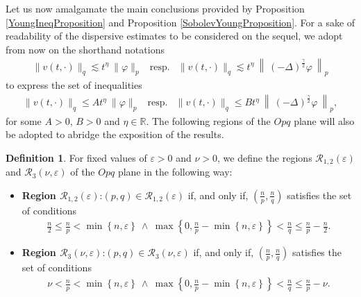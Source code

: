 \documentclass{amsart}
\theoremstyle{definition}
\newtheorem{definition}[theorem]{Definition}
\theoremstyle{remark}
\numberwithin{equation}{section}
\begin{document}
Let us now amalgamate the main conclusions provided by Proposition \ref{YoungIneqProposition} and Proposition \ref{SobolevYoungProposition}.
For a sake of readability of the dispersive estimates to be considered on the sequel, we adopt from now on the shorthand notations 
\begin{eqnarray*}
	\|v(t,\cdot)\|_q\lesssim t^{\eta}~\|\varphi\|_p & \mbox{resp.}& \|v(t,\cdot)\|_q\lesssim t^{\eta}~\left\|~(-\Delta)^{\frac{\gamma}{2}}\varphi~\right\|_p 
\end{eqnarray*} 
to express the set of inequalities
\begin{eqnarray*}
	\|v(t,\cdot)\|_q\leq At^{\eta}~\|\varphi\|_p & \mbox{resp.} & \|v(t,\cdot)\|_q\leq B t^{\eta}~\left\|~(-\Delta)^{\frac{\gamma}{2}}\varphi~\right\|_p, 
\end{eqnarray*}
for some $A>0$, $B>0$ and $\eta \in \mathbb{R}$. The following regions of the
$Opq$ plane will also be adopted to abridge the exposition of the results.\newpage 
\begin{definition}
	For fixed values of $\varepsilon>0$ and $\nu>0$, we define the regions $\mathcal{R}_{1,2}(\varepsilon)$ and $\mathcal{R}_{3}(\nu,\varepsilon)$ of the $Opq$ plane in the following way:
	\begin{itemize}
		\item[~]{\bf Region $\mathcal{R}_{1,2}(\varepsilon)$}:\newline $(p,q)\in \mathcal{R}_{1,2}(\varepsilon)$ if, and only if, $\displaystyle \left(\frac{n}{p},\frac{n}{q}\right)$ satisfies the set of conditions
		\begin{eqnarray}
			\label{Ogamma12}
			\displaystyle \frac{n}{2}\leq  \frac{n}{p}<\min\left\{n,\varepsilon\right\} ~\wedge~ \displaystyle \max\left\{0,\frac{n}{p}-\min\left\{n,\varepsilon\right\}\right\}< \frac{n}{q}\leq\frac{n}{p}-\frac{n}{2}.		\end{eqnarray}
		\item[~]{\bf Region $\mathcal{R}_{3}(\nu,\varepsilon)$}:\newline $(p,q)\in \mathcal{R}_3(\nu,\varepsilon)$ if, and only if, $\displaystyle \left(\frac{n}{p},\frac{n}{q}\right)$ satisfies the set of conditions
		\begin{eqnarray}
			\label{Ogamma3}	\displaystyle \nu< \frac{n}{p}<\min\left\{n,\varepsilon\right\} ~\wedge~ \displaystyle \max\left\{0,\frac{n}{p}-\min\left\{n,\varepsilon\right\}\right\}< \frac{n}{q}\leq\frac{n}{p}-\nu.	\end{eqnarray}
	\end{itemize}
\end{definition}
\end{document}
